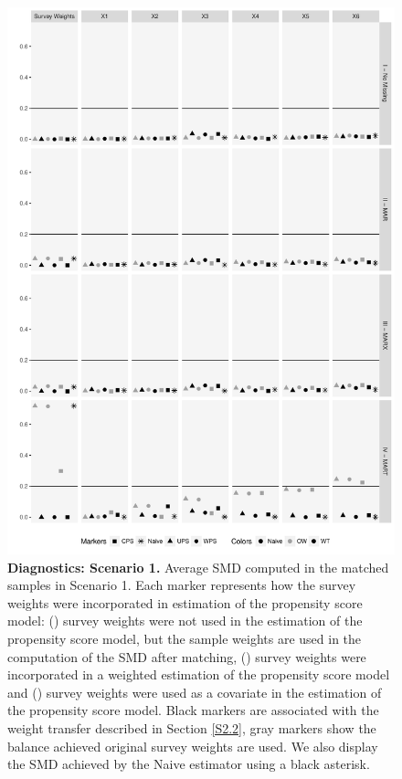 \documentclass[oupdraft]{bio}
\newcommand{\mysquare}[1]{\tikz{\node[draw=#1,fill=#1,rectangle,minimum
width=0.18cm,minimum height=0.18cm,inner sep=0pt] at (0,0) {};}}
\newcommand{\mycircle}[1]{\tikz{\node[draw=#1,fill=#1,circle,minimum
width=0.2cm,minimum height=0.2cm,inner sep=0pt] at (0,0) {};}}
\newcommand{\mytriangle}[1]{\tikz{\node[draw=#1,fill=#1,isosceles
triangle,isosceles triangle stretches,shape border rotate=90,minimum
width=0.2cm,minimum height=0.2cm,inner sep=0pt] at (0,0) {};}}
\begin{document}
\begin{figure}[t]
\centering
\includegraphics[scale=0.63]{SMD_SC1_v2.pdf}
\caption{{\small{}\textbf{Diagnostics: Scenario 1.} Average SMD computed in the matched samples in Scenario 1. Each marker represents how the survey weights were incorporated in estimation of the propensity score model: (\mytriangle{black}) survey weights were not used in the estimation of the propensity score model, but the sample weights are used in the computation of the SMD after matching, (\mycircle{black}) survey weights were incorporated in a weighted estimation of the propensity score model and (\mysquare{black})  survey weights were used as a covariate in the estimation of the propensity score model. Black markers are associated with the weight transfer described in Section \ref{S2.2}, gray markers show the balance achieved original survey weights are used. We also display the SMD achieved by the Naive estimator using a black asterisk.}}
\label{Diagnostics1} 
\end{figure}
\end{document}

